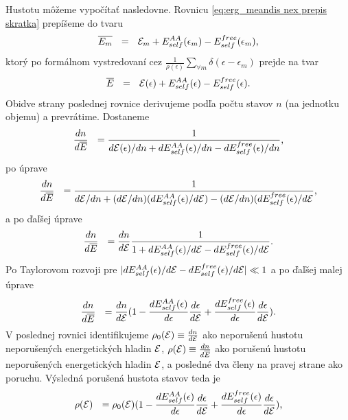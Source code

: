 Hustotu môžeme vypočítať nasledovne. Rovnicu \eqref{eq:erg_meandis nex prepis skratka}
prepíšeme do tvaru
\begin{equation}\label{eq:erg_meandis nex prepis skratka2}
 \overline{E_m} \ \ = \ \ \mathcal{E}_m + E_{self}^{AA}(\epsilon_m) - E_{self}^{free}(\epsilon_m)  \text{,}
\end{equation}
ktorý po formálnom vystredovaní cez $\frac{1}{\rho(\epsilon)}\sum_{\forall m} \delta(\epsilon-\epsilon_{m})$
prejde na tvar
\begin{equation}
 \overline{E} \ \ = \ \ \E(\epsilon) + E_{self}^{AA}(\epsilon) - E_{self}^{free}(\epsilon)  \text{.}
\end{equation}
Obidve strany poslednej rovnice derivujeme podľa počtu stavov $n$ (na jednotku objemu) a prevrátime. Dostaneme
\begin{equation}
\frac{dn}{d\overline{E}} \ \ = \frac{1}{d\mathcal{E}(\epsilon)/dn + dE_{self}^{AA}(\epsilon)/dn - dE_{self}^{free}(\epsilon)/dn}  \text{,}
\end{equation}
po úprave
\begin{equation}\label{eq:erg_meandis nex prepis skratka4}
\frac{dn}{d\overline{E}} \ \ = \frac{1}{d\mathcal{E}/dn + (d\mathcal{E}/dn)(dE_{self}^{AA}(\epsilon)/d\mathcal{E}) - (d\mathcal{E}/dn)(dE_{self}^{free}(\epsilon)/d\mathcal{E}}  \text{,}
\end{equation}
a po ďaľšej úprave
\begin{equation}
\frac{dn}{d\overline{E}} \ \ = \frac{dn}{d\mathcal{E}}\frac{1}{1 + dE_{self}^{AA}(\epsilon)/d\mathcal{E} - dE_{self}^{free}(\epsilon)/d\mathcal{E}}  \text{.}
\end{equation}
Po Taylorovom rozvoji pre $|dE_{self}^{AA}(\epsilon)/d\mathcal{E} - dE_{self}^{free}(\epsilon)/d\mathcal{E}|  \ll 1$ a po ďaľšej malej úprave
\begin{equation}
\frac{dn}{d\overline{E}} \ \ = \frac{dn}{d\mathcal{E}} (1 - \frac{dE_{self}^{AA}(\epsilon)}{d\epsilon}\frac{d\epsilon}{d\mathcal{E}} + \frac{dE_{self}^{free}(\epsilon)}{d\epsilon}\frac{d\epsilon}{d\mathcal{E}}) \text{.}
\end{equation}
V poslednej rovnici identifikujeme $\rho_0(\mathcal{E}) \equiv \frac{dn}{d\mathcal{E}}$ ako neporušenú hustotu neporušených energetických hladin $\mathcal{E}$,
$\rho(\mathcal{E}) \equiv \frac{dn}{d\overline{E}}$ ako porušenú hustotu neporušených energetických hladin $\mathcal{E}$, a posledné dva členy na pravej strane ako poruchu.
Výsledná porušená hustota stavov teda je
\begin{equation}\label{eq:erg_meandis nex prepis skratka6}
\rho(\mathcal{E}) \ \ = \rho_0(\mathcal{E}) (1 - \frac{dE_{self}^{AA}(\epsilon)}{d\epsilon}\frac{d\epsilon}{d\mathcal{E}} + \frac{dE_{self}^{free}(\epsilon)}{d\epsilon}\frac{d\epsilon}{d\mathcal{E}}) \text{,}
\end{equation}
